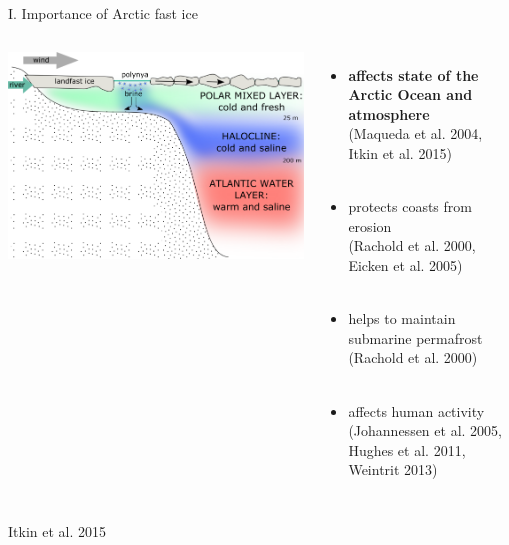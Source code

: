 \documentclass[8pt]{beamer}
\newcommand\Fontvi{\fontsize{6}{7.2}\selectfont}
\begin{document}
\setwatermark{\fontsize{125pt}{125pt}\selectfont{}}
\begin{frame}[fragile]{I. Importance of Arctic fast ice}
	\begin{columns}
			\includegraphics[width=1\textwidth]{./img/ImportanceFI.png}\\
		\begin{itemize}
			\item\textbf{affects state of the Arctic Ocean and atmosphere}\\(Maqueda et al. 2004, Itkin et al. 2015)\\~\\ 
			\item protects coasts from erosion\\(Rachold et al. 2000, Eicken et al. 2005)\\~\\ 
			\item helps to maintain submarine permafrost\\ (Rachold et al. 2000)\\~\\
			\item affects human activity\\(Johannessen et al. 2005, Hughes et al. 2011, Weintrit 2013)
		\end{itemize}
	\end{columns}
\Fontvi
Itkin et al. 2015
\end{frame}
\end{document}
